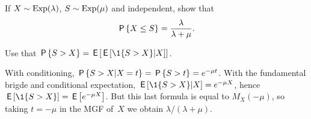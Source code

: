 \documentclass[queueing-book.tex]{subfiles}
\begin{document}
\begin{exercise}\label{ex:3}
 If  
$X\sim \Exp{\lambda}$, $S\sim\Exp{\mu}$  and independent, show that
 \begin{equation*}
 \P{X\leq S} = \frac{\lambda}{\lambda+\mu}.
 \end{equation*}
\begin{hint}
Use that $\P{S > X} = \E{\E{\1{S>X}|X}}$.
\end{hint}
\begin{solution}
With conditioning, $\P{S>X|X=t} = \P{S>t} =e^{-\mu t}$.
With the fundamental brigde and conditional expectation, $\E{\1{S>X}|X} = e^{-\mu X}$, hence $\E{\1{S>X}} = \E{e^{-\mu X}}$. But this last formula is equal to
$M_{X}(-\mu)$, so taking $t=-\mu$ in the MGF of~$X$ we obtain $\lambda/(\lambda+\mu)$.
\end{solution}
\end{exercise}


\end{document}
